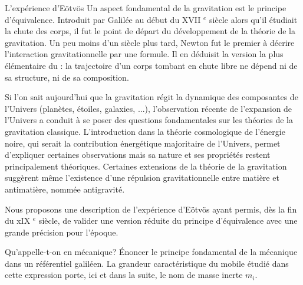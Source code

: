 \begin{exo}[PC][1][devoir]{L'expérience d'Eötvös}
Un aspect fondamental de la gravitation est le principe d'équivalence. Introduit par Galilée au début du XVII ${ }^{e}$ siècle alors qu'il étudiait la chute des corps, il fut le point de départ du développement de la théorie de la gravitation. Un peu moins d'un siècle plus tard, Newton fut le premier à décrire l'interaction gravitationnelle par une formule. Il en déduisit la version la plus élémentaire du  : la trajectoire d'un corps tombant en chute libre ne dépend ni de sa structure, ni de sa composition.


Si l'on sait aujourd'hui que la gravitation régit la dynamique des composantes de l'Univers (planètes, étoiles, galaxies, ...), l'observation récente de l'expansion de l'Univers a conduit à se poser des questions fondamentales sur les théories de la gravitation classique. L'introduction dans la théorie cosmologique de l'énergie noire, qui serait la contribution énergétique majoritaire de l'Univers, permet d'expliquer certaines observations mais sa nature et ses propriétés restent principalement théoriques. Certaines extensions de la théorie de la gravitation suggèrent même l'existence d'une répulsion gravitationnelle entre matière et antimatière, nommée antigravité.

Nous proposons une description de l'expérience d'Eötvös ayant permis, dès la fin du xIX $^{e}$ siècle, de valider une version réduite du principe d'équivalence avec une grande précision pour l'époque.

\begin{quest}
\item Qu'appelle-t-on  en mécanique? Énoncer le principe fondamental de la mécanique dans un référentiel galiléen. La grandeur caractéristique du mobile étudié dans cette expression porte, ici et dans la suite, le nom de masse inerte $m_{i}$.


\end{quest}
\end{exo}
